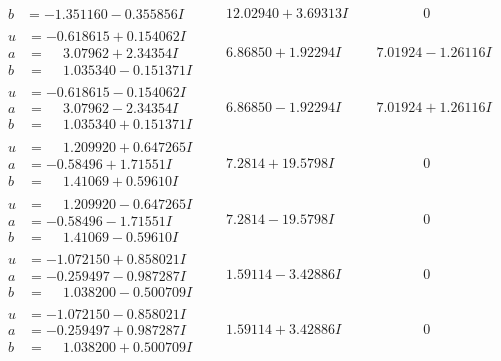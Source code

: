 \documentclass[1p]{elsarticle_modified}
\theoremstyle{definition}
\begin{document}
$$\begin{array}{c|c|c}
\begin{aligned}
b &= -1.351160 - 0.355856 I\end{aligned}
 & \phantom{-}12.02940 + 3.69313 I & \phantom{-0.000000 } 0 \\ \hline\begin{aligned}
u &= -0.618615 + 0.154062 I \\
a &= \phantom{-}3.07962 + 2.34354 I \\
b &= \phantom{-}1.035340 - 0.151371 I\end{aligned}
 & \phantom{-}6.86850 + 1.92294 I & \phantom{-}7.01924 - 1.26116 I \\ \hline\begin{aligned}
u &= -0.618615 - 0.154062 I \\
a &= \phantom{-}3.07962 - 2.34354 I \\
b &= \phantom{-}1.035340 + 0.151371 I\end{aligned}
 & \phantom{-}6.86850 - 1.92294 I & \phantom{-}7.01924 + 1.26116 I \\ \hline\begin{aligned}
u &= \phantom{-}1.209920 + 0.647265 I \\
a &= -0.58496 + 1.71551 I \\
b &= \phantom{-}1.41069 + 0.59610 I\end{aligned}
 & \phantom{-}7.2814 + 19.5798 I & \phantom{-0.000000 } 0 \\ \hline\begin{aligned}
u &= \phantom{-}1.209920 - 0.647265 I \\
a &= -0.58496 - 1.71551 I \\
b &= \phantom{-}1.41069 - 0.59610 I\end{aligned}
 & \phantom{-}7.2814 - 19.5798 I & \phantom{-0.000000 } 0 \\ \hline\begin{aligned}
u &= -1.072150 + 0.858021 I \\
a &= -0.259497 - 0.987287 I \\
b &= \phantom{-}1.038200 - 0.500709 I\end{aligned}
 & \phantom{-}1.59114 - 3.42886 I & \phantom{-0.000000 } 0 \\ \hline\begin{aligned}
u &= -1.072150 - 0.858021 I \\
a &= -0.259497 + 0.987287 I \\
b &= \phantom{-}1.038200 + 0.500709 I\end{aligned}
 & \phantom{-}1.59114 + 3.42886 I & \phantom{-0.000000 } 0 \\ \hline\begin{aligned}

\end{aligned}
\end{array}$$
\end{document}
